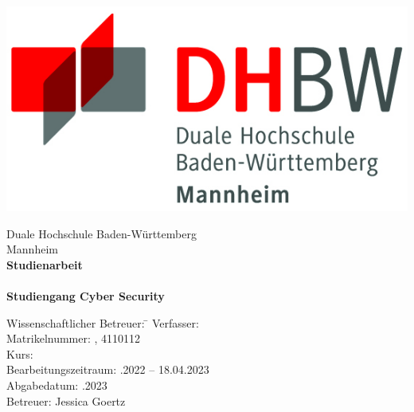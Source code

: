 \begin{titlepage}
    \begin{minipage}{\textwidth}
            \vspace{-2cm}
            \noindent
             \hfill   
             \includegraphics{img/logo.jpg}
    \end{minipage}
    \vspace{1em}
    \sffamily
    \begin{center}
        \textsf{\large{}Duale Hochschule Baden-W\"urttemberg\\[1.5mm] Mannheim}\\[2em]
        \textsf{\textbf{\Large{}Studienarbeit}}\\[3mm]
        \textsf{\textbf{\DerTitelDerArbeit}} \\[1.5cm]
        \textsf{\textbf{\Large{}Studiengang Cyber Security}\\[3mm]}
        
        \vspace{3em}
    \vfill
    
    \begin{minipage}{\textwidth}
    
    \begin{tabbing}
        Wissenschaftlicher Betreuer: \hspace{0.85cm}\=\kill
        Verfasser: \> \DerAutorDerArbeit \\[1.5mm]
        Matrikelnummer: , 4110112 \\[1.5mm]
        Kurs: \> \DieKursbezeichnung \\[1.5mm]
        Bearbeitungszeitraum: .2022 -- 18.04.2023\\
        Abgabedatum: .2023\\
        Betreuer: \> Jessica Goertz\\
    \end{tabbing}
    
    \end{minipage}
    
    \end{center}
    
    \end{titlepage}